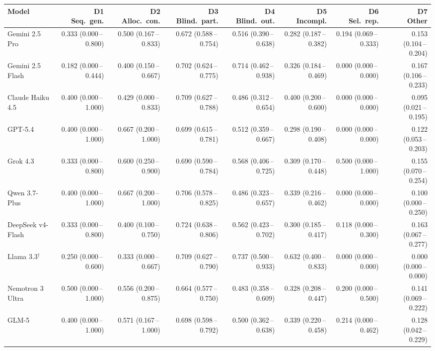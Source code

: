 \begin{tabular}{lrrrrrrr}
\toprule
Model & \makecell{D1\\Seq.\ gen.} & \makecell{D2\\Alloc.\ con.} & \makecell{D3\\Blind.\ part.} & \makecell{D4\\Blind.\ out.} & \makecell{D5\\Incompl.} & \makecell{D6\\Sel.\ rep.} & \makecell{D7\\Other} \\
\midrule
Gemini 2.5 Pro & 0.333 (0.000\,--\,0.800) & 0.500 (0.167\,--\,0.833) & 0.672 (0.588\,--\,0.754) & 0.516 (0.390\,--\,0.638) & 0.282 (0.187\,--\,0.382) & 0.194 (0.069\,--\,0.333) & 0.153 (0.104\,--\,0.204) \\
Gemini 2.5 Flash & 0.182 (0.000\,--\,0.444) & 0.400 (0.150\,--\,0.667) & 0.702 (0.624\,--\,0.775) & 0.714 (0.462\,--\,0.938) & 0.326 (0.184\,--\,0.469) & 0.000 (0.000\,--\,0.000) & 0.167 (0.106\,--\,0.233) \\
Claude Haiku 4.5 & 0.400 (0.000\,--\,1.000) & 0.429 (0.000\,--\,0.833) & 0.709 (0.627\,--\,0.788) & 0.486 (0.312\,--\,0.654) & 0.400 (0.200\,--\,0.600) & 0.000 (0.000\,--\,0.000) & 0.095 (0.021\,--\,0.195) \\
GPT-5.4 & 0.400 (0.000\,--\,1.000) & 0.667 (0.200\,--\,1.000) & 0.699 (0.615\,--\,0.781) & 0.512 (0.359\,--\,0.667) & 0.298 (0.190\,--\,0.408) & 0.000 (0.000\,--\,0.000) & 0.122 (0.053\,--\,0.203) \\
Grok 4.3 & 0.333 (0.000\,--\,0.800) & 0.600 (0.250\,--\,0.900) & 0.690 (0.590\,--\,0.784) & 0.568 (0.406\,--\,0.725) & 0.309 (0.170\,--\,0.448) & 0.500 (0.000\,--\,1.000) & 0.155 (0.070\,--\,0.254) \\
Qwen 3.7-Plus & 0.400 (0.000\,--\,1.000) & 0.667 (0.200\,--\,1.000) & 0.706 (0.578\,--\,0.825) & 0.486 (0.323\,--\,0.657) & 0.339 (0.216\,--\,0.462) & 0.000 (0.000\,--\,0.000) & 0.100 (0.000\,--\,0.250) \\
DeepSeek v4-Flash & 0.333 (0.000\,--\,0.800) & 0.400 (0.100\,--\,0.750) & 0.724 (0.638\,--\,0.806) & 0.562 (0.423\,--\,0.702) & 0.300 (0.185\,--\,0.417) & 0.118 (0.000\,--\,0.300) & 0.163 (0.067\,--\,0.277) \\
Llama 3.3$^\dagger$ & 0.250 (0.000\,--\,0.600) & 0.333 (0.000\,--\,0.667) & 0.709 (0.627\,--\,0.790) & 0.737 (0.500\,--\,0.933) & 0.632 (0.400\,--\,0.833) & 0.000 (0.000\,--\,0.000) & 0.000 (0.000\,--\,0.000) \\
Nemotron 3 Ultra & 0.500 (0.000\,--\,1.000) & 0.556 (0.200\,--\,0.875) & 0.664 (0.577\,--\,0.750) & 0.483 (0.358\,--\,0.609) & 0.328 (0.208\,--\,0.447) & 0.200 (0.000\,--\,0.500) & 0.141 (0.069\,--\,0.222) \\
GLM-5 & 0.400 (0.000\,--\,1.000) & 0.571 (0.167\,--\,1.000) & 0.698 (0.598\,--\,0.792) & 0.500 (0.362\,--\,0.638) & 0.339 (0.220\,--\,0.458) & 0.214 (0.000\,--\,0.462) & 0.128 (0.042\,--\,0.229) \\
\bottomrule
\end{tabular}